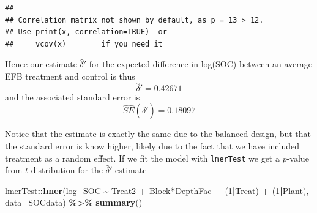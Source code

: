 \documentclass[
]{article}
\newenvironment{Shaded}{\begin{snugshade}}{\end{snugshade}}
\newcommand{\AttributeTok}[1]{\textcolor[rgb]{0.13,0.29,0.53}{#1}}
\newcommand{\DecValTok}[1]{\textcolor[rgb]{0.00,0.00,0.81}{#1}}
\newcommand{\FunctionTok}[1]{\textcolor[rgb]{0.13,0.29,0.53}{\textbf{#1}}}
\newcommand{\NormalTok}[1]{#1}
\newcommand{\SpecialCharTok}[1]{\textcolor[rgb]{0.81,0.36,0.00}{\textbf{#1}}}
\begin{document}
\begin{verbatim}
## 
## Correlation matrix not shown by default, as p = 13 > 12.
## Use print(x, correlation=TRUE)  or
##     vcov(x)        if you need it
\end{verbatim}

Hence our estimate \(\hat{\delta}'\) for the expected difference in
log(SOC) between an average EFB treatment and control is thus \[
\hat{\delta}' = 0.42671 
\] and the associated standard error is \[
\hat{SE}(\hat{\delta}') = 0.18097 
\]

Notice that the estimate is exactly the same due to the balanced design,
but that the standard error is know higher, likely due to the fact that
we have included treatment as a random effect. If we fit the model with
\texttt{lmerTest} we get a \(p\)-value from \(t\)-distribution for the
\(\hat{\delta}'\) estimate

\begin{Shaded}
\begin{Highlighting}[]
\NormalTok{lmerTest}\SpecialCharTok{::}\FunctionTok{lmer}\NormalTok{(log\_SOC }\SpecialCharTok{\textasciitilde{}}\NormalTok{ Treat2 }\SpecialCharTok{+}\NormalTok{ Block}\SpecialCharTok{*}\NormalTok{DepthFac }\SpecialCharTok{+}\NormalTok{ (}\DecValTok{1}\SpecialCharTok{|}\NormalTok{Treat) }\SpecialCharTok{+}\NormalTok{ (}\DecValTok{1}\SpecialCharTok{|}\NormalTok{Plant),}
\AttributeTok{data=}\NormalTok{SOCdata) }\SpecialCharTok{\%\textgreater{}\%} \FunctionTok{summary}\NormalTok{()}
\end{Highlighting}
\end{Shaded}
\end{document}
